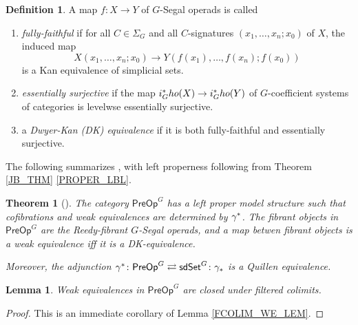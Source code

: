 \documentclass[a4paper,10pt
,draft
]{article}%
\numberwithin{equation}{section}
\numberwithin{figure}{section}
\newtheorem{theorem}[equation]{Theorem}%
\newtheorem{lemma}[equation]{Lemma}%
\theoremstyle{definition} %
\newtheorem{definition}[equation]{Definition}%
\newcommand{\1}{\ensuremath{\mathbbm 1}}%
\begin{document}
\begin{definition}
      A map $f \colon X \to Y$ of $G$-Segal operads is called
      \begin{enumerate}[label = (\roman*)]
      \item \textit{fully-faithful} if for all $C \in \Sigma_G$ and all $C$-signatures $(x_1,\dots, x_n;x_0)$ of $X$, the induced map
            \[
                  X(x_1, \dots, x_n; x_0) \to Y(f(x_1), \dots, f(x_n); f(x_0))
            \]
            is a Kan equivalence of simplicial sets.
      \item \textit{essentially surjective} if the map 
      $i_G^{\**}ho(X) \to i_G^{\**}ho(Y)$ of $G$-coefficient systems of categories
            is levelwse essentially surjective.
      \item a \textit{Dwyer-Kan (DK) equivalence} if it is both fully-faithful and essentially surjective.
      \end{enumerate}
\end{definition}

The following summarizes \cite[Theorems 4.39, 4.42, and 5.48, and Corollary 5.51]{BP_edss},
with left properness following from Theorem \ref{JB_THM} \ref{PROPER_LBL}.
\begin{theorem}[\cite{BP_edss}]
      \label{PREOPQE_THM}
      The category $\mathsf{PreOp}^G$ has a left proper model structure such that
      cofibrations and weak equivalences are determined by $\gamma^{\**}$.
      The fibrant objects in $\mathsf{PreOp}^G$ are the Reedy-fibrant $G$-Segal operads,
      and a map betwen fibrant objects is a weak equivalence iff it is a DK-equivalence.
      
      Moreover, the adjunction $\gamma^{\**} \colon \mathsf{PreOp}^G \rightleftarrows \mathsf{sdSet}^G \colon \gamma_{\**}$
      is a Quillen equivalence.
\end{theorem}

\begin{lemma}
      \label{FCOLIM_WE2_LEM}
      Weak equivalences in $\mathsf{PreOp}^G$ are closed under filtered colimits.
\end{lemma}
\begin{proof}
      This is an immediate corollary of Lemma \ref{FCOLIM_WE_LEM}.
\end{proof}
\end{document}
